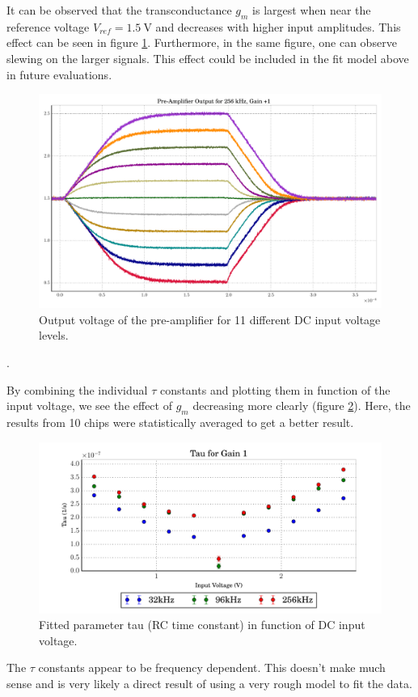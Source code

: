 It can be observed that the transconductance $g_m$ is largest  when  near  the
reference  voltage $V_{ref}=\SI{1.5}{\volt}$ and decreases with  higher  input
amplitudes. This effect  can  be  seen  in figure \ref{fig:preamp_11_signals}.
Furthermore, in the  same  figure,  one  can  observe  slewing  on  the larger
signals.  This  effect  could  be included in the fit model  above  in  future
evaluations.

\begin{figure}
    \centering
    \includegraphics[width=.7\linewidth]{images/plots/vinComparisonPreamp.pdf}
    \caption{Output voltage of the pre-amplifier for 11 different DC input voltage levels.}
    \label{fig:preamp_11_signals}
\end{figure}
. 

By combining the individual $\tau$ constants and  plotting them in function of
the input voltage, we see the  effect of $g_m$ decreasing more clearly (figure
\ref{fig:tau}).  Here,  the  results from 10 chips were statistically averaged to get a better result.

\begin{figure}
    \centering
    \includegraphics[width=.7\linewidth]{images/plots/tau_results_1.pdf}
    \caption{Fitted parameter tau (RC time constant) in function of DC input voltage.}
    \label{fig:tau}
\end{figure}

The $\tau$ constants  appear to be frequency dependent. This doesn't make much
sense and is very likely a direct  result  of  using a very rough model to fit
the data.

